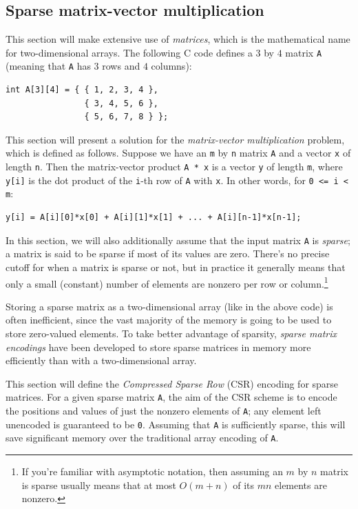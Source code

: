 \documentclass{article}
\theoremstyle{definition}
\begin{document}
\subsection{Sparse matrix-vector multiplication}

This section will make extensive use of \emph{matrices}, which is the mathematical name for two-dimensional arrays. The following C code defines a $3$ by $4$ matrix \texttt{A} (meaning that \texttt{A} has $3$ rows and $4$ columns):

\begin{verbatim}
int A[3][4] = { { 1, 2, 3, 4 }, 
                { 3, 4, 5, 6 },
                { 5, 6, 7, 8 } };
\end{verbatim}  

This section will present a solution for the \emph{matrix-vector multiplication} problem, which is defined as follows. Suppose we have an \texttt{m} by \texttt{n} matrix \texttt{A} and a vector \texttt{x} of length \texttt{n}. Then the matrix-vector product \texttt{A * x} is a vector \texttt{y} of length \texttt{m}, where \texttt{y[i]} is the dot product of the \texttt{i}-th row of \texttt{A} with \texttt{x}. In other words, for \texttt{0 <= i < m}:

\begin{verbatim}
y[i] = A[i][0]*x[0] + A[i][1]*x[1] + ... + A[i][n-1]*x[n-1];
\end{verbatim}

In this section, we will also additionally assume that the input matrix \texttt{A} is \emph{sparse}; a matrix is said to be sparse if most of its values are zero. There's no precise cutoff for when a matrix is sparse or not, but in practice it generally means that only a small (constant) number of elements are nonzero per row or column.\footnote{If you're familiar with asymptotic notation, then assuming an $m$ by $n$ matrix is sparse usually means that at most $O(m + n)$ of its $mn$ elements are nonzero.} 

Storing a sparse matrix as a two-dimensional array (like in the above code) is often inefficient, since the vast majority of the memory is going to be used to store zero-valued elements. To take better advantage of sparsity, \emph{sparse matrix encodings} have been developed to store sparse matrices in memory more efficiently than with a two-dimensional array.

This section will define the \emph{Compressed Sparse Row} (CSR) encoding for sparse matrices. For a given sparse matrix \texttt{A}, the aim of the CSR scheme is to encode the positions and values of just the nonzero elements of \texttt{A}; any element left unencoded is guaranteed to be \texttt{0}. Assuming that \texttt{A} is sufficiently sparse, this will save significant memory over the traditional array encoding of \texttt{A}.
\end{document}
